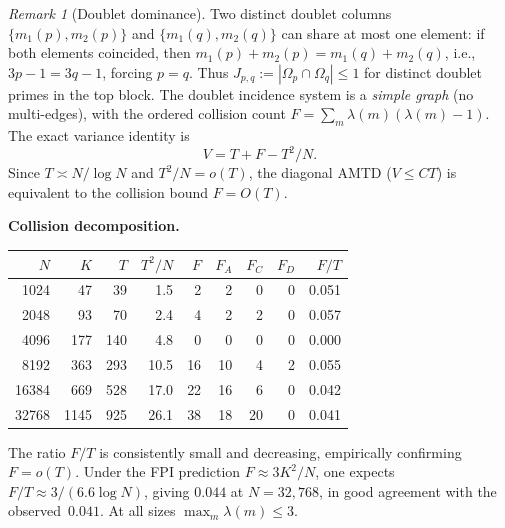 \documentclass[11pt]{article}
\theoremstyle{definition}
\theoremstyle{remark}
\newtheorem{remark}[theorem]{Remark}
\begin{document}
\begin{remark}[Doublet dominance]
Two distinct doublet columns
$\{m_1(p), m_2(p)\}$ and $\{m_1(q), m_2(q)\}$
can share at most one element:
if both elements coincided,
then $m_1(p) + m_2(p) = m_1(q) + m_2(q)$,
i.e., $3p - 1 = 3q - 1$, forcing $p = q$.
Thus $J_{p,q} := |\Omega_p \cap \Omega_q| \le 1$
for distinct doublet primes in the top block.
The doublet incidence system is a
\emph{simple graph} (no multi-edges),
with the ordered collision count
$F = \sum_m \lambda(m)(\lambda(m) - 1)$.
The exact variance identity is
\[
  V = T + F - T^2/N.
\]
Since $T \asymp N/\log N$ and $T^2/N = o(T)$,
the diagonal AMTD ($V \le CT$) is equivalent
to the collision bound $F = O(T)$.

\medskip
\noindent\textbf{Collision decomposition.}

\smallskip
\begin{center}
\begin{tabular}{rrrrrrrrr}
\toprule
$N$ & $K$ & $T$ & $T^2/N$ & $F$ & $F_A$ & $F_C$ & $F_D$ & $F/T$ \\
\midrule
1024 & 47 & 39 & 1.5 & 2 & 2 & 0 & 0 & 0.051 \\
2048 & 93 & 70 & 2.4 & 4 & 2 & 2 & 0 & 0.057 \\
4096 & 177 & 140 & 4.8 & 0 & 0 & 0 & 0 & 0.000 \\
8192 & 363 & 293 & 10.5 & 16 & 10 & 4 & 2 & 0.055 \\
16384 & 669 & 528 & 17.0 & 22 & 16 & 6 & 0 & 0.042 \\
32768 & 1145 & 925 & 26.1 & 38 & 18 & 20 & 0 & 0.041 \\
\bottomrule
\end{tabular}
\end{center}
\smallskip
\noindent
The ratio $F/T$ is consistently small and
decreasing, empirically confirming $F = o(T)$.
Under the FPI prediction
$F \approx 3K^2/N$, one expects
$F/T \approx 3/(6.6\log N)$,
giving $0.044$ at $N = 32{,}768$,
in good agreement with the observed~$0.041$.
At all sizes $\max_m\lambda(m) \le 3$.
\end{remark}
\end{document}
